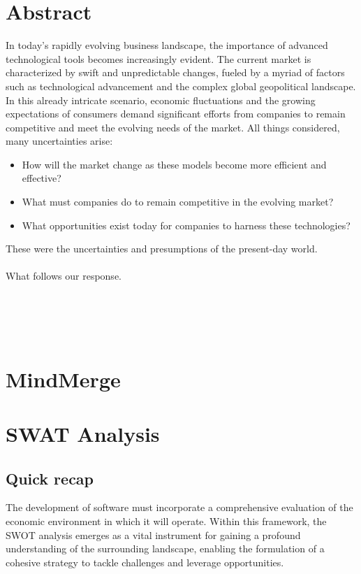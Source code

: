 \documentclass{article}
\begin{document}
\newpage
{}
\section*{Abstract}   %
In today's rapidly evolving business landscape, the importance of advanced technological tools becomes increasingly evident. The current market is characterized by swift and unpredictable changes, fueled by a myriad of factors such as technological advancement and the complex global geopolitical landscape. In this already intricate scenario, economic fluctuations and the growing expectations of consumers demand significant efforts from companies to remain competitive 
and meet the evolving needs of the market. All things considered, many uncertainties arise:

\begin{itemize}
    \item How will the market change as these models become more efficient and effective?
    \item What must companies do to remain competitive in the evolving market?
    \item What opportunities exist today for companies to harness these technologies?
\end{itemize}
These were the uncertainties and presumptions of the present-day world.\\
\\
What follows our response.
\\
\\
\\
\\
\\

\section*{MindMerge}
\pagebreak
\restoregeometry

\section{SWAT Analysis}
\subsection{Quick recap}
The development of software must incorporate a comprehensive evaluation of the economic environment in which it will operate.
Within this framework, the SWOT analysis emerges as a vital instrument for gaining a profound understanding of the surrounding landscape, enabling the formulation of a cohesive strategy to tackle challenges and leverage opportunities.
\end{document}
